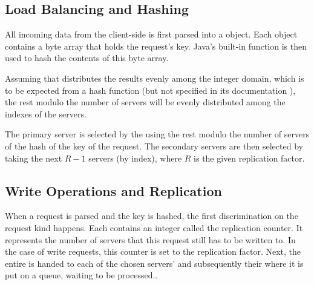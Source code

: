 \documentclass[11pt]{article}
\begin{document}


\subsection{Load Balancing and Hashing}\label{sec:desc:hashing}

% 
All incoming data from the client-side is first parsed into a  object.
Each  object contains a byte array that holds the request's key.
Java's built-in function  is then used to hash the contents of this byte array.

Assuming that  distributes the results evenly among the integer domain, which is to be expected from a hash function (but not specified in its documentation \cite{javaArrayHash}), the rest modulo the number of servers will be evenly distributed among the indexes of the servers.

The primary server is selected by the using the rest modulo the number of servers of the hash of the key of the request.
The secondary servers are then selected by taking the next $R-1$ servers (by index), where $R$ is the given replication factor.


\subsection{Write Operations and Replication}\label{sec:desc:writes}

% 

When a request is parsed and the key is hashed, the first discrimination on the request kind happens.
Each  contains an integer called the replication counter.
It represents the number of servers that this request still has to be written to.
In the case of write requests, this counter is set to the replication factor.
Next, the entire  is handed to each of the chosen servers'  and subsequently their  where it is put on a queue, waiting to be processed..
\end{document}
